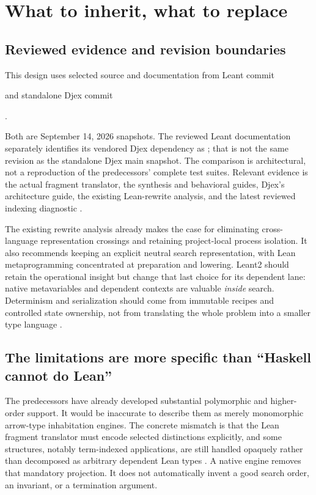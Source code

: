 \section{What to inherit, what to replace}
\label{sec:predecessors}

\subsection{Reviewed evidence and revision boundaries}

This design uses selected source and documentation from Leant commit
\begin{center}\small{}\end{center}
and standalone Djex commit
\begin{center}\small{}.\end{center}
Both are September 14, 2026 snapshots. The reviewed Leant documentation separately identifies its vendored Djex dependency as ; that is not the same revision as the standalone Djex main snapshot. The comparison is architectural, not a reproduction of the predecessors' complete test suites. Relevant evidence is the actual fragment translator, the synthesis and behavioral guides, Djex's architecture guide, the existing Lean-rewrite analysis, and the latest reviewed indexing diagnostic \cite{leant-fragment,leant-internals,leant-behavior,djex-architecture,rewrite-analysis,indexing-report}.

The existing rewrite analysis already makes the case for eliminating cross-language representation crossings and retaining project-local process isolation. It also recommends keeping an explicit neutral search representation, with Lean metaprogramming concentrated at preparation and lowering. Leant2 should retain the operational insight but change that last choice for its dependent lane: native metavariables and dependent contexts are valuable \emph{inside} search. Determinism and serialization should come from immutable recipes and controlled state ownership, not from translating the whole problem into a smaller type language \cite{rewrite-analysis}.

\subsection{The limitations are more specific than ``Haskell cannot do Lean''}

The predecessors have already developed substantial polymorphic and higher-order support. It would be inaccurate to describe them as merely monomorphic arrow-type inhabitation engines. The concrete mismatch is that the Lean fragment translator must encode selected distinctions explicitly, and some structures, notably term-indexed applications, are still handled opaquely rather than decomposed as arbitrary dependent Lean types \cite{leant-fragment}. A native engine removes that mandatory projection. It does not automatically invent a good search order, an invariant, or a termination argument.

